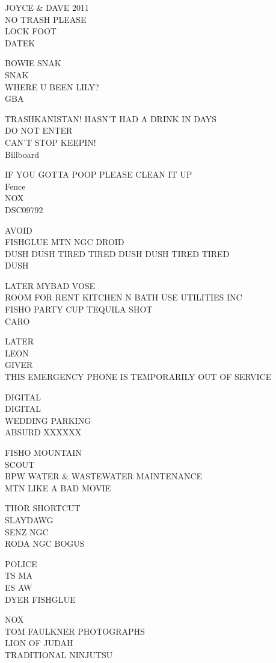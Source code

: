 \documentclass[10pt,letterpaper]{article}
\begin{document}
JOYCE \& DAVE 2011\\
NO TRASH PLEASE\\
LOCK FOOT\\
DATEK

BOWIE SNAK\\
SNAK\\
WHERE U BEEN LILY?\\
GBA

TRASHKANISTAN! HASN'T HAD A DRINK IN DAYS\\
DO NOT ENTER\\
CAN'T STOP KEEPIN!\\
Billboard

IF YOU GOTTA POOP PLEASE CLEAN IT UP\\
Fence\\
NOX\\
DSC09792

AVOID\\
FISHGLUE MTN NGC DROID\\
DUSH DUSH TIRED TIRED DUSH DUSH TIRED TIRED\\
DUSH

LATER MYBAD VOSE\\
ROOM FOR RENT KITCHEN N BATH USE UTILITIES INC\\
FISHO PARTY CUP TEQUILA SHOT\\
CARO

LATER\\
LEON\\
GIVER\\
THIS EMERGENCY PHONE IS TEMPORARILY OUT OF SERVICE

DIGITAL\\
DIGITAL\\
WEDDING PARKING\\
ABSURD XXXXXX

FISHO MOUNTAIN\\
SCOUT\\
BPW WATER \& WASTEWATER MAINTENANCE\\
MTN LIKE A BAD MOVIE

THOR SHORTCUT\\
SLAYDAWG\\
SENZ NGC\\
RODA NGC BOGUS

POLICE\\
TS MA\\
ES AW\\
DYER FISHGLUE

NOX\\
TOM FAULKNER PHOTOGRAPHS\\
LION OF JUDAH\\
TRADITIONAL NINJUTSU
\end{document}
